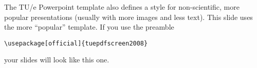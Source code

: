 \documentclass[a4paper]{article}            %
\begin{document}
\makeatletter
\@officialtrue
\makeatother
\begin{slidetop}
\vspace*{1.3cm}\hspace*{-3mm}
\begin{minipage}{16cm}

The TU/e Powerpoint template also defines a style for non-scientific, more popular presentations (usually with more images and less text).
This slide uses the more ``popular'' template. If you use the preamble

\begin{verbatim}
\usepackage[official]{tuepdfscreen2008}
\end{verbatim}

your slides will look like this one.
\end{minipage}

\end{slidetop}
\end{document}
